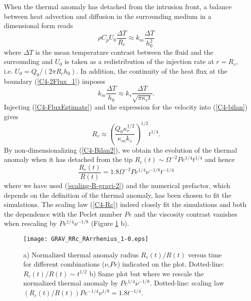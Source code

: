 When  the thermal  anomaly has  detached from  the intrusion  front, a
balance between heat advection and diffusion in the surrounding medium
in a dimensional form reads
\begin{equation}
  \rho C_p U_0 \frac{\Delta T}{R_c} \approx k_m \frac{\Delta T}{h_0^2}
  \label{C4-bilan}
\end{equation}
where $\Delta  T$ is the  mean temperature contrast between  the fluid
and the  surrounding and  $U_0$ is  taken as  a redistribution  of the
injection rate at $r=R_c$, i.e. $U_0=Q_0/(2\pi R_c h_0)$. In addition,
the continuity  of the  heat flux  at the  boundary (\ref{C4-2Flux_1})
imposes
\begin{equation}
  k_m\frac{\Delta   T}{h_0}\approx   k_s   \frac{\Delta   T}{\sqrt{\pi
      \kappa_r t}}.
  \label{C4-FluxEstimate}
\end{equation}
Injecting (\ref{C4-FluxEstimate}) and the  expression for the velocity
into (\ref{C4-bilan}) gives
\begin{equation}
  R_c \approx  \left(\frac{Q_0\kappa_r^{1/2}}{\kappa_m k_s}\right)^{1/2}
  t^{1/4}.
  \label{C4-Bilan2}
\end{equation}
By non-dimensionalizing (\ref{C4-Bilan2}), we  obtain the evolution of
the   thermal   anomaly   when   it  has   detached   from   the   tip
$R_c(t)\sim \Omega^{-2}Pe^{1/4}t^{1/4}$ and hence
\begin{equation}
  \frac{R_c(t)}{R(t)} = 1.8\Omega^{-2}Pe^{1/4}\nu^{-1/8}t^{-1/4}
  \label{C4-Rc}
\end{equation}
where  we  have  used   (\ref{scaling-R-gravi-2})  and  the  numerical
prefactor, which depends on the definition of the thermal anomaly, has
been  chosen to  fit the  simulations. The  scaling law  (\ref{C4-Rc})
indeed closely  fit the simulations  and both the dependence  with the
Peclet number $Pe$ and the  viscosity contrast vanishes when rescaling
by $Pe^{1/4}\nu^{-1/8}$ (Figure \ref{C4-GRAV_RRc_RArrhenius_1-0} b).

\begin{figure}
  \begin{center}
    \graphicspath{ {/Users/thorey/Documents/These/Projet/Refroidissement/Skin_Model/Figure/Figure_Heating/} }
    \texttt{[image: GRAV\_RRc\_RArrhenius\_1-0.eps]}
    \caption{a) Normalized thermal anomaly radius $R_c(t)/R(t)$ versus
      time for  different combinations  ($\nu$,$Pe$) indicated  on the
      plot.  Dotted-line:  $R_c(t)/R(t)\sim t^{1/2}$ b) Same  plot but
      where   we   rescale   the   normalized   thermal   anomaly   by
      $Pe^{1/4}\nu^{-1/8}$.        Dotted-line:      scaling       law
      $(R_c(t)/R(t))Pe^{-1/4}\nu^{1/8}= 1.8t^{-1/4}$.}
    \label{C4-GRAV_RRc_RArrhenius_1-0}
  \end{center}
\end{figure}

